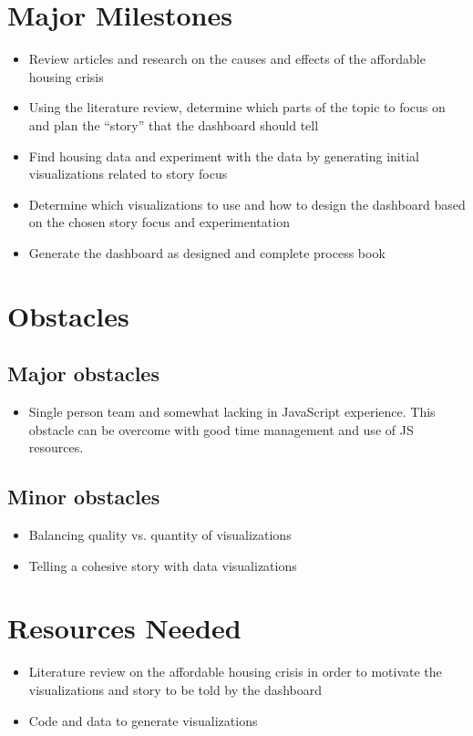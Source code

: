 \documentclass{proc}
\begin{document}
\section{Major Milestones}
\begin{itemize}
    \item Review articles and research on the causes and effects of the affordable housing crisis
    \item Using the literature review, determine which parts of the topic to focus on and plan the “story” that the dashboard should tell
    \item Find housing data and experiment with the data by generating initial visualizations related to story focus
    \item Determine which visualizations to use and how to design the dashboard based on the chosen story focus and experimentation
    \item Generate the dashboard as designed and complete process book 
\end{itemize}

\section{Obstacles}

\subsection{Major obstacles} %
\begin{itemize}
    \item Single person team and somewhat lacking in JavaScript experience. This obstacle can be overcome with good time management and use of JS resources. 
\end{itemize}

\subsection{Minor obstacles}
\begin{itemize}
    \item Balancing quality vs. quantity of visualizations
    \item Telling a cohesive story with data visualizations 
\end{itemize}

\section{Resources Needed}
\begin{itemize}
    \item Literature review on the affordable housing crisis in order to motivate the visualizations and story to be told by the dashboard
    \item Code and data to generate visualizations
\end{itemize}
\end{document}
